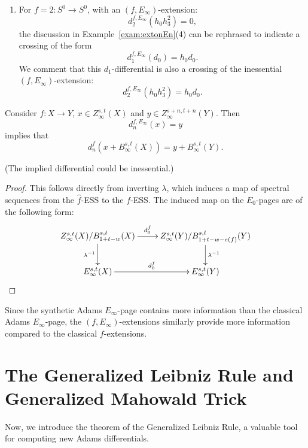 \documentclass{amsart}
\numberwithin{equation}{section}
\begin{document}
\begin{example}
\begin{enumerate}
        \item For $f = 2: S^0 \rightarrow S^0$, with an $(f, E_\infty)$-extension:
        $$d_2^{f, E_\infty} (h_0 h_3^2) = 0,$$
        the discussion in Example~\ref{exam:extonEn}(4) can be rephrased to indicate a crossing of the form
        $$d_1^{f, E_\infty} (d_0) = h_0 d_0.$$
        We comment that this $d_1$-differential is also a crossing of the inessential $(f, E_\infty)$-extension:
        $$d_2^{f, E_\infty} (h_0 h_3^2) = h_0 d_0.$$
    \end{enumerate}
\end{example}

\begin{proposition}
    Consider $f: X\to Y$, $x\in Z_\infty^{s,t}(X)$ and $y\in Z_\infty^{s+n,t+n}(Y)$.
    Then
    $$d^{f,E_\infty}_n(x)=y$$
    implies that
    $$d^{f}_n(x+B_\infty^{s,t}(X))=y+B_\infty^{s,t}(Y).$$
\end{proposition}
(The implied differential could be inessential.)
\begin{proof}
  This follows directly from inverting $\lambda$, which induces a map of spectral sequences from the $\hat f$-ESS to the $f$-ESS. The induced map on the $E_0$-pages are of the following form:
    $$\xymatrix{
    Z_\infty^{s,t}(X)/B_{1+t-w}^{s,t}(X)\ar[r]^-{d^{\hat f}_0}\ar[d]_{\lambda^{-1}} & Z_\infty^{s,t}(Y)/B_{1+t-w-e(f)}^{s,t}(Y)\ar[d]^{\lambda^{-1}}\\
    E_\infty^{s,t}(X)\ar[r]^-{d^{f}_0} & E_\infty^{s, t}(Y)
    }$$
\end{proof}
\begin{remark}
    Since the synthetic Adams $E_\infty$-page contains more information than the classical Adams $E_\infty$-page, the $(f,E_\infty)$-extensions similarly provide more information compared to the classical $f$-extensions.
\end{remark}

\section{The Generalized Leibniz Rule and Generalized Mahowald Trick} \label{sec:rules}

Now, we introduce the theorem of the Generalized Leibniz Rule, a valuable tool for computing new Adams differentials.
\end{document}
